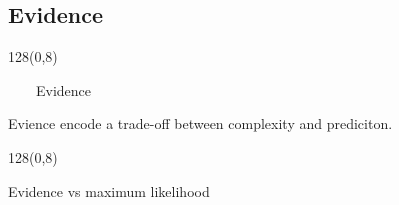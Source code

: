 \documentclass[shownotes]{beamer}
\begin{document}
\subsection{Evidence}


\begin{frame}
\begin{textblock}{128}(0,8)
\begin{center}
 \large \ \ \ \  Evidence 
\end{center}
\end{textblock}
\vspace{1cm}
 
 
 \pause

 \begin{mdframed}[backgroundcolor=black!15]
\centering
Evience encode a trade-off between complexity and prediciton.
\end{mdframed}
 
\end{frame}


\begin{frame}
\begin{textblock}{128}(0,8)
\begin{center}
 \large Evidence vs maximum likelihood
\end{center}
\end{textblock}
\vspace{0.75cm}



\end{frame}
\end{document}
